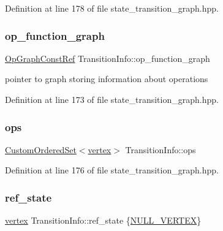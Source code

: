 Definition at line 178 of file state\+\_\+transition\+\_\+graph.\+hpp.

\mbox{\label{classTransitionInfo_afb75a6d60b513f6e76a01a9fff783648}} 
\subsubsection{\texorpdfstring{op\+\_\+function\+\_\+graph}{op\_function\_graph}}
{\footnotesize\ttfamily \hyperlink{op__graph_8hpp_a9a0b240622c47584bee6951a6f5de746}{Op\+Graph\+Const\+Ref} Transition\+Info\+::op\+\_\+function\+\_\+graph\hspace{0.3cm}{\ttfamily [private]}}



pointer to graph storing information about operations 



Definition at line 173 of file state\+\_\+transition\+\_\+graph.\+hpp.

\mbox{\label{classTransitionInfo_a9cae3532489545307b89372045ebb5b5}} 
\subsubsection{\texorpdfstring{ops}{ops}}
{\footnotesize\ttfamily \hyperlink{classCustomOrderedSet}{Custom\+Ordered\+Set}$<$\hyperlink{graph_8hpp_abefdcf0544e601805af44eca032cca14}{vertex}$>$ Transition\+Info\+::ops\hspace{0.3cm}{\ttfamily [private]}}



Definition at line 176 of file state\+\_\+transition\+\_\+graph.\+hpp.

\mbox{\label{classTransitionInfo_ae886125493b01b32ad8638e40d6bbdd5}} 
\subsubsection{\texorpdfstring{ref\+\_\+state}{ref\_state}}
{\footnotesize\ttfamily \hyperlink{graph_8hpp_abefdcf0544e601805af44eca032cca14}{vertex} Transition\+Info\+::ref\+\_\+state \{\hyperlink{graph_8hpp_ac3c33c45c396860b76e8aff4dd2b8158}{N\+U\+L\+L\+\_\+\+V\+E\+R\+T\+EX}\}\hspace{0.3cm}{\ttfamily [private]}}



